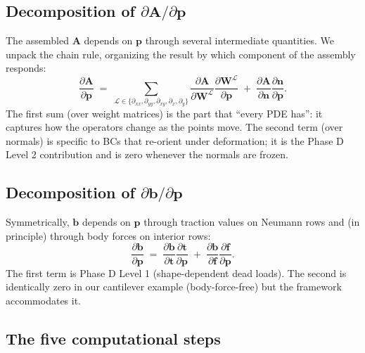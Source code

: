 \documentclass[11pt,a4paper]{article}
\newcommand{\mat}[1]{\mathbf{#1}}
\newcommand{\vect}[1]{\boldsymbol{#1}}
\newcommand{\pts}{\vect{p}}
\begin{document}
\subsection{Decomposition of \texorpdfstring{$\partial\mat A/\partial\pts$}{dA/dp}}

The assembled $\mat A$ depends on $\pts$ through several intermediate
quantities. We unpack the chain rule, organizing the result by which
component of the assembly responds:
\begin{equation}
  \frac{\partial\mat A}{\partial\pts}
  \;=\;
  \sum_{\mathcal L \in \{\partial_{xx}, \partial_{yy},
       \partial_{xy}, \partial_x, \partial_y\}}
       \frac{\partial\mat A}{\partial \mat W^{\mathcal L}}
       \frac{\partial \mat W^{\mathcal L}}{\partial \pts}
  \;+\;
  \frac{\partial\mat A}{\partial\vect n}
  \frac{\partial\vect n}{\partial\pts}.
  \label{eq:dAdp-decomp}
\end{equation}
The first sum (over weight matrices) is the part that ``every PDE
has'': it captures how the operators change as the points move.
The second term (over normals) is specific to BCs that
re-orient under deformation; it is the Phase D Level 2
contribution and is zero whenever the normals are frozen.

\subsection{Decomposition of \texorpdfstring{$\partial\vect b/\partial\pts$}{db/dp}}

Symmetrically, $\vect b$ depends on $\pts$ through traction values
on Neumann rows and (in principle) through body forces on interior
rows:
\begin{equation}
  \frac{\partial\vect b}{\partial\pts}
  \;=\;
  \frac{\partial\vect b}{\partial\vect t}
  \frac{\partial\vect t}{\partial\pts}
  \;+\;
  \frac{\partial\vect b}{\partial\vect f}
  \frac{\partial\vect f}{\partial\pts}.
  \label{eq:dbdp-decomp}
\end{equation}
The first term is Phase D Level 1 (shape-dependent dead loads).
The second is identically zero in our cantilever example
(body-force-free) but the framework accommodates it.

\subsection{The five computational steps}
\end{document}
